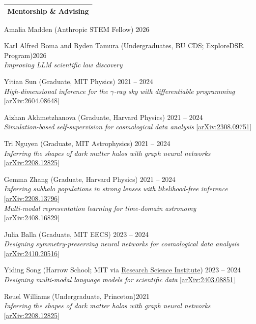 \documentclass[letterpaper,11pt]{article}
\makeatletter
\newenvironment{packed_itemize}{
\begin{itemize}[label=\raisebox{0.25ex}{\tiny$\bullet$}, topsep=0pt, partopsep=0pt]
  \setlength{\itemsep}{4.0pt}
  \setlength{\parskip}{0pt}
  \setlength{\parsep}{0pt}}{\end{itemize}
}
\newcommand{\cvsection}[2]{%
  \needspace{4\baselineskip}%
  \par\vspace{3mm}%
  \noindent
  \begin{tabular*}{\textwidth}{l@{\extracolsep{\fill}}}
  \large {\sc \Large{#2}}\\
  \hline
  \end{tabular*}\vspace{3mm}%
}
\makeatother
\begin{document}
\cvsection{\faMagic}{Mentorship \& Advising}

\begin{packed_itemize}
  \item Amalia Madden (Anthropic STEM Fellow) \hfill 2026 
  \item Karl Alfred Boma and Ryden Tamura (Undergraduates, {BU CDS}; ExploreDSR Program)\hfill 2026 \\ \emph{Improving LLM scientific law discovery}
  \item Yitian Sun (Graduate, {MIT Physics}) \hfill 2021 -- 2024 \\ \emph{High-dimensional inference for the $\gamma$-ray sky with differentiable programming} \href{https://arxiv.org/abs/2604.08648}{[arXiv:2604.08648]}
  \item Aizhan Akhmetzhanova (Graduate, {Harvard Physics}) \hfill 2021 -- 2024 \\ \emph{Simulation-based self-supervision for cosmological data analysis} \href{https://arxiv.org/abs/2308.09751}{[arXiv:2308.09751]}
  \item Tri Nguyen (Graduate, {MIT Astrophysics}) \hfill 2021 -- 2024 \\ \emph{Inferring the shapes of dark matter halos with graph neural networks} \href{https://arxiv.org/abs/2208.12825}{[arXiv:2208.12825]}
  \item Gemma Zhang (Graduate, {Harvard Physics}) \hfill 2021 -- 2024 \\ \emph{Inferring subhalo populations in strong lenses with likelihood-free inference} \href{https://arxiv.org/abs/2208.13796}{[arXiv:2208.13796]} \\ \emph{Multi-modal representation learning for time-domain astronomy} \href{https://arxiv.org/abs/2408.16829}{[arXiv:2408.16829]}
  \item Julia Balla (Graduate, {MIT EECS}) \hfill 2023 -- 2024 \\ \emph{Designing symmetry-preserving neural networks for cosmological data analysis} \href{https://arxiv.org/abs/2410.20516}{[arXiv:2410.20516]}
  \item Yiding Song (Harrow School; {MIT} via \href{https://www.cee.org/programs/research-science-institute}{Research Science Institute}) \hfill 2023 -- 2024 \\ \emph{Designing multi-modal language models for scientific data} \href{https://arxiv.org/abs/2403.08851}{[arXiv:2403.08851]}
  \item Reuel Williams (Undergraduate, {Princeton})\hfill 2021 \\ \emph{Inferring the shapes of dark matter halos with graph neural networks} \href{https://arxiv.org/abs/2208.12825}{[arXiv:2208.12825]}

\end{packed_itemize}
\end{document}
